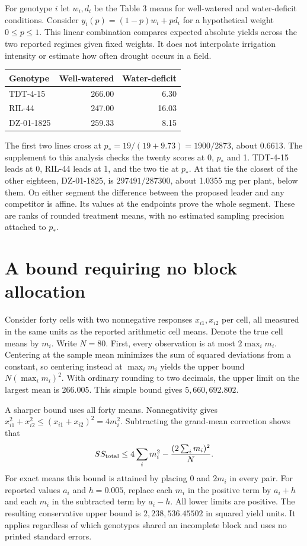 \documentclass[11pt]{article}
\begin{document}
For genotype $i$ let $w_i,d_i$ be the Table 3 means for well-watered and water-deficit conditions. Consider $y_i(p)=(1-p)w_i+p d_i$ for a hypothetical weight $0\leq p\leq1$. This linear combination compares expected absolute yields across the two reported regimes given fixed weights. It does not interpolate irrigation intensity or estimate how often drought occurs in a field.
\begin{center}
\begin{tabular}{lrr}
\toprule
Genotype & Well-watered & Water-deficit\\
\midrule
TDT-4-15 &266.00&6.30\\
RIL-44 &247.00&16.03\\
DZ-01-1825 &259.33&8.15\\
\bottomrule
\end{tabular}
\end{center}
The first two lines cross at $p_* = 19/(19+9.73)=1900/2873$, about 0.6613. The supplement to this analysis checks the twenty scores at 0, $p_*$ and 1. TDT-4-15 leads at 0, RIL-44 leads at 1, and the two tie at $p_*$. At that tie the closest of the other eighteen, DZ-01-1825, is $297491/287300$, about 1.0355 mg per plant, below them. On either segment the difference between the proposed leader and any competitor is affine. Its values at the endpoints prove the whole segment. These are ranks of rounded treatment means, with no estimated sampling precision attached to $p_*$.

\section{A bound requiring no block allocation}
Consider forty cells with two nonnegative responses $x_{i1},x_{i2}$ per cell, all measured in the same units as the reported arithmetic cell means. Denote the true cell means by $m_i$. Write $N=80$. First, every observation is at most $2\max_i m_i$. Centering at the sample mean minimizes the sum of squared deviations from a constant, so centering instead at $\max_i m_i$ yields the upper bound $N(\max_i m_i)^2$. With ordinary rounding to two decimals, the upper limit on the largest mean is 266.005. This simple bound gives $5{,}660{,}692.802$.

A sharper bound uses all forty means. Nonnegativity gives
$x_{i1}^2+x_{i2}^2\leq(x_{i1}+x_{i2})^2=4m_i^2$.
Subtracting the grand-mean correction shows that
\[
  SS_{\rm total}\leq 4\sum_i m_i^2-
      \frac{(2\sum_i m_i)^2}{N}.
\]
For exact means this bound is attained by placing $0$ and $2m_i$ in every pair. For reported values $a_i$ and $h=0.005$, replace each $m_i$ in the positive term by $a_i+h$ and each $m_i$ in the subtracted term by $a_i-h$. All lower limits are positive. The resulting conservative upper bound is $2{,}238{,}536.45502$ in squared yield units. It applies regardless of which genotypes shared an incomplete block and uses no printed standard errors.
\end{document}
